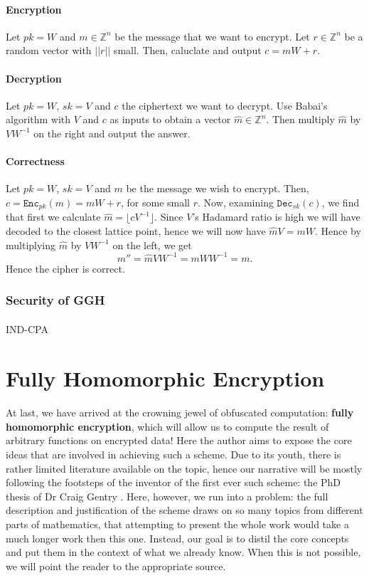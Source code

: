 \documentclass{article}
\theoremstyle{definition}
\theoremstyle{example}
\newcommand{\Enc}{\texttt{Enc}}
\newcommand{\Dec}{\texttt{Dec}}
\newcommand{\Int}{\mathbb{Z}}
\newcommand{\norm}[1]{||#1||}
\begin{document}
\paragraph{Encryption}
Let $pk = W$ and $m \in \Int^n$ be the message that we want to encrypt. Let $r
\in \Int^n$ be a random vector with $\norm{r}$ small. Then, caluclate and output
$c = mW + r$.
\paragraph{Decryption}
Let $pk = W$, $sk = V$ and $c$ the ciphertext we want to decrypt. Use Babai's
algorithm with $V$ and $c$ as inputs to obtain a vector $\hat{m} \in \Int^n$. Then multiply
$\hat{m}$ by $VW^{-1}$ on the right and output the answer.
\paragraph{Correctness}
Let $pk = W$, $sk = V$ and $m$ be the message we wish to encrypt. Then, $c =
\Enc_{pk}(m) = mW + r$, for some small $r$. Now, examining $\Dec_{sk}(c)$, we
find that first we calculate $\hat{m} = \lfloor cV^{-1} \rfloor$. Since $V$'s
Hadamard ratio is high we will have decoded to the closest lattice point, hence
we will now have $\hat{m}V = mW$. Hence by multiplying $\hat{m}$ by $VW^{-1}$ on
the left, we get
\[
  m'' = \hat{m}VW^{-1} = mWW^{-1} = m.
\]
Hence the cipher is correct.
\subsubsection{Security of GGH}
\paragraph{} IND-CPA
\section{Fully Homomorphic Encryption}
\paragraph{} At last, we have arrived at the crowning jewel of obfuscated
computation: \textbf{fully homomorphic encryption}, which will allow us to
compute the result of arbitrary functions on encrypted data! Here the author
aims to expose the core ideas that are involved in achieving such a scheme. Due
to its youth, there is rather limited literature available on the topic, hence
our narrative will be mostly following the footsteps of the inventor of the first
ever such scheme: the PhD thesis of Dr Craig Gentry \cite{gentry2009fully}.
Here, however, we run into a problem: the full description and justification of
the scheme draws on so many topics from different parts of mathematics, that
attempting to present the whole work would take a much longer work then this
one. Instead, our goal is to distil the core concepts and put them in the
context of what we already know. When this is not possible, we will point the
reader to the appropriate source.
\end{document}
